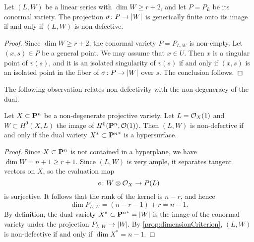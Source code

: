 \begin{proposition}
  \label{prop:dimensionCriterion}
  Let $(L, W)$ be a linear series with $\dim W \geq r+2$, and let $P = P_L$ be its conormal variety.
  The projection $\sigma\from P \to |W|$ is generically finite onto its image if and only if $(L, W)$ is non-defective. 
\end{proposition}

\begin{proof}
  Since $\dim W \geq r+2$, the conormal variety $P = P_{L,W}$ is non-empty.
  Let $(x,s) \in P$ be a general point.
  We may assume that $x \in U$.
  Then $x$ is a singular point of $v(s)$, and it is an isolated singularity of $v(s)$ if and only if $(x,s)$ is an isolated point in the fiber of $\sigma \from P \to |W|$ over $s$.
  The conclusion follows.
\end{proof}

The following observation relates non-defectivity with the non-degeneracy of the dual.
\begin{proposition}\label{prop:non-deg-dual}
  Let $X \subset \P^n$ be a non-degenerate projective variety.  Let $L = \O_X(1)$ and $W \subset H^0(X, L)$ the image of $H^0(\P^n, \O(1))$.
  Then $(L, W)$ is non-defective if and only if the dual variety $X^* \subset {\P^n}^*$ is a hypersurface.
\end{proposition}
\begin{proof}
  Since $X \subset \P^n$ is not contained in a hyperplane, we have $\dim W = n+1 \geq r+1$.
  Since $(L, W)$ is very ample, it separates tangent vectors on $X$, so the evaluation map
  \[ e \from W \otimes \O_X \to P(L)  \]
  is surjective.
  It follows that the rank of the kernel is $n-r$, and hence
  \[ \dim P_{L,W} = (n-r - 1) + r = n-1.\]
  By definition, the dual variety $X^* \subset {\P^n}^* = |W|$ is the image of the conormal variety under the projection $P_{L,W} \to |W|$.
  By \autoref{prop:dimensionCriterion}, $(L, W)$ is non-defective if and only if $\dim X^* = n-1$.
\end{proof}

